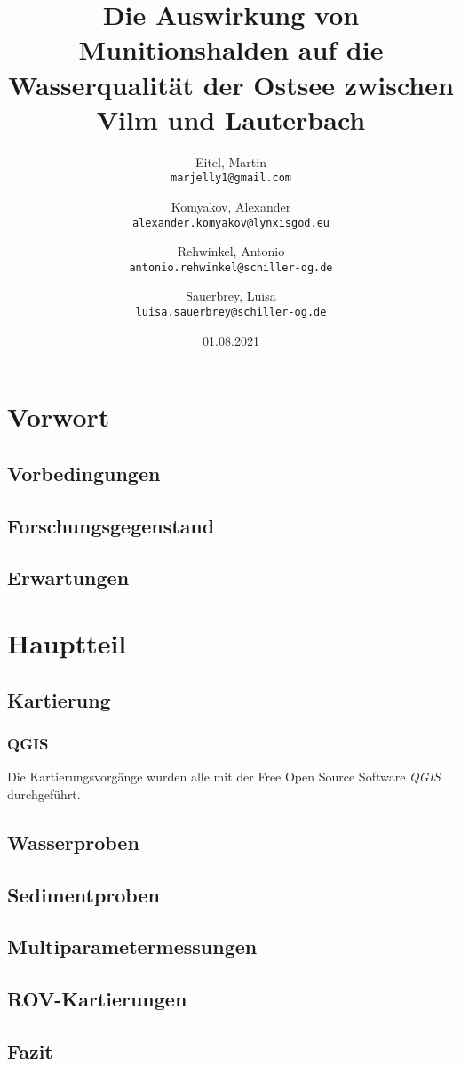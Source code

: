 \documentclass[12pt,titlepage]{scrreprt}
\begin{document}
\begin{titlepage}
\title{Die Auswirkung von Munitionshalden auf die Wasserqualität der Ostsee zwischen Vilm und Lauterbach}
\date{01.08.2021}
\author{Eitel, Martin \\ \texttt{marjelly1@gmail.com}\and Komyakov, Alexander \\\texttt{alexander.komyakov@lynxisgod.eu} \\ \and Rehwinkel, Antonio \\ \texttt{antonio.rehwinkel@schiller-og.de} \\ \and Sauerbrey, Luisa \\ \texttt{luisa.sauerbrey@schiller-og.de}}
\maketitle
\end{titlepage}
\tableofcontents
\chapter{Vorwort}
\section{Vorbedingungen}
\section{Forschungsgegenstand}
\section{Erwartungen}
\chapter{Hauptteil}
\section{Kartierung}
    \subsection*{QGIS}
    Die Kartierungsvorgänge wurden alle mit der Free Open Source Software \emph{QGIS}\cite{qgis} durchgeführt.
    
\section{Wasserproben}
\section{Sedimentproben}
\section{Multiparametermessungen}
\section{ROV-Kartierungen}
\section{Fazit}
\end{document}

